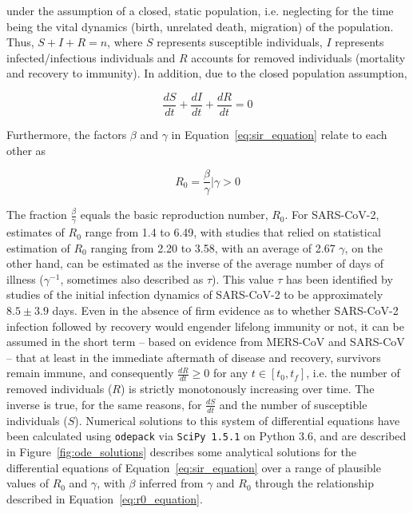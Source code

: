 \documentclass[12pt]{article}
\begin{document}
\noindent under the assumption of a closed, static population, i.e. neglecting for the time being the vital dynamics (birth, unrelated death, migration) of the population. Thus, $S + I + R = n$, where $S$ represents susceptible individuals, $I$ represents infected/infectious individuals and $R$ accounts for removed individuals (mortality and recovery to immunity). In addition, due to the closed population assumption, 

\begin{equation}
	\frac{dS}{dt} + \frac{dI}{dt} + \frac{dR}{dt} = 0
\end{equation}

Furthermore, the factors $\beta$ and $\gamma$ in Equation~\eqref{eq:sir_equation} relate to each other as

\begin{equation}
	R_0 = \frac{\beta}{\gamma} | \gamma > 0
	\label{eq:r0_equation}
\end{equation}

The fraction $\frac{\beta}{\gamma}$ equals the basic reproduction number, $R_0$. For SARS-CoV-2, estimates of $R_0$ range from 1.4 to 6.49, with studies that relied on statistical estimation of $R_0$ ranging from 2.20 to 3.58, with an average of 2.67\cite{liu2020reproductive} $\gamma$, on the other hand, can be estimated as the inverse of the average number of days of illness ($\gamma^{-1}$, sometimes also described as $\tau$). This value $\tau$ has been identified by studies of the initial infection dynamics of SARS-CoV-2 to be approximately $8.5 \pm 3.9$ days.\cite{pan2020clinical,liu2020risk} Even in the absence of firm evidence as to whether SARS-CoV-2 infection followed by recovery would engender lifelong immunity or not,\cite{roy2020covid,ota2020will,lin2020duration} it can be assumed in the short term -- based on evidence from MERS-CoV and SARS-CoV -- that at least in the immediate aftermath of disease and recovery, survivors remain immune,\cite{prompetchara2020immune} and consequently $\frac{dR}{dt} \geq 0$ for any $t \in [t_0, t_f]$, i.e. the number of removed individuals ($R$) is strictly monotonously increasing over time. The inverse is true, for the same reasons, for $\frac{dS}{dt}$ and the number of susceptible individuals ($S$). Numerical solutions to this system of differential equations have been calculated using \texttt{odepack} via \texttt{SciPy 1.5.1}\cite{virtanen2020scipy} on Python 3.6, and are described in Figure~\ref{fig:ode_solutions} describes some analytical solutions for the differential equations of Equation~\eqref{eq:sir_equation} over a range of plausible values of $R_0$ and $\gamma$, with $\beta$ inferred from $\gamma$ and $R_0$ through the relationship described in Equation~\eqref{eq:r0_equation}.
\end{document}
